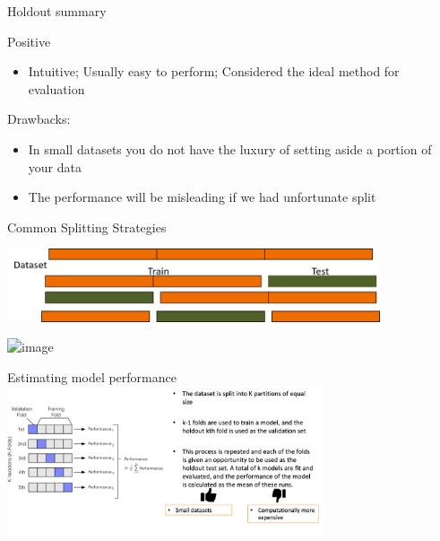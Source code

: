 \documentclass[aspectratio=169,14pt,usenames,dvipsnames]{beamer}
\begin{document}
\begin{frame}[t]{Holdout summary}
\begin{block}{Positive}
\begin{itemize}
\item Intuitive; Usually easy to perform; Considered the ideal method for evaluation
\end{itemize}
\end{block}
\begin{block}{Drawbacks:}
\begin{itemize}
\item In small datasets you do not have the luxury of setting aside a portion of your data
\item The performance will be misleading if we had unfortunate split
\end{itemize}
\end{block}
\end{frame}


\begin{frame}[t]{Common Splitting Strategies}
\begin{overlayarea}{14cm}{7cm}
\begin{itemize}
\begin{center}
\includegraphics[width=11cm]{Images/AIML_MLPrinciples_IMG9.png}
\end{center}
\begin{center}
\includegraphics<2->[width=11cm]{Images/AIML_MLPrinciples_IMG10.png}
\end{center}
\end{itemize}
\end{overlayarea}
\end{frame}


\begin{frame}[t]{Estimating model performance}
\centering
\includegraphics[width=0.7\textwidth, height=0.5\textheight]{Images/AIML_MLPrinciples_IMG11.png}
\end{frame}
\end{document}
